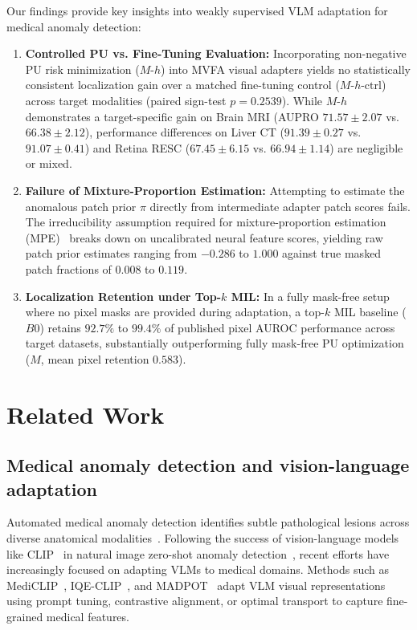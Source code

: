 \documentclass[10pt,twocolumn,letterpaper]{article}
\begin{document}
Our findings provide key insights into weakly supervised VLM adaptation for medical anomaly detection:
\begin{enumerate}
    \item \textbf{Controlled PU vs. Fine-Tuning Evaluation:} Incorporating non-negative PU risk minimization ($M\text{-}h$) into MVFA visual adapters yields no statistically consistent localization gain over a matched fine-tuning control ($M\text{-}h\text{-ctrl}$) across target modalities (paired sign-test $p = 0.2539$). While $M\text{-}h$ demonstrates a target-specific gain on Brain MRI (AUPRO $71.57 \pm 2.07$ vs. $66.38 \pm 2.12$), performance differences on Liver CT ($91.39 \pm 0.27$ vs. $91.07 \pm 0.41$) and Retina RESC ($67.45 \pm 6.15$ vs. $66.94 \pm 1.14$) are negligible or mixed.
    \item \textbf{Failure of Mixture-Proportion Estimation:} Attempting to estimate the anomalous patch prior $\pi$ directly from intermediate adapter patch scores fails. The irreducibility assumption required for mixture-proportion estimation (MPE)~\cite{ramaswamy2016mpe} breaks down on uncalibrated neural feature scores, yielding raw patch prior estimates ranging from $-0.286$ to $1.000$ against true masked patch fractions of $0.008$ to $0.119$.
    \item \textbf{Localization Retention under Top-$k$ MIL:} In a fully mask-free setup where no pixel masks are provided during adaptation, a top-$k$ MIL baseline ($B0$) retains $92.7\%$ to $99.4\%$ of published pixel AUROC performance across target datasets, substantially outperforming fully mask-free PU optimization ($M$, mean pixel retention $0.583$).
\end{enumerate}

\section{Related Work}
\label{sec:related}

\subsection{Medical anomaly detection and vision-language adaptation}
Automated medical anomaly detection identifies subtle pathological lesions across diverse anatomical modalities~\cite{medicalad_survey2021, bmad2024}. Following the success of vision-language models like CLIP~\cite{clip2021} in natural image zero-shot anomaly detection~\cite{winclip2023, aprilgan2023, anomalyclip2023, adaclip2024, vcpclip2024}, recent efforts have increasingly focused on adapting VLMs to medical domains. Methods such as MediCLIP~\cite{mediclip2024}, IQE-CLIP~\cite{iqeclip2026}, and MADPOT~\cite{madpot2026} adapt VLM visual representations using prompt tuning, contrastive alignment, or optimal transport to capture fine-grained medical features.
\end{document}
